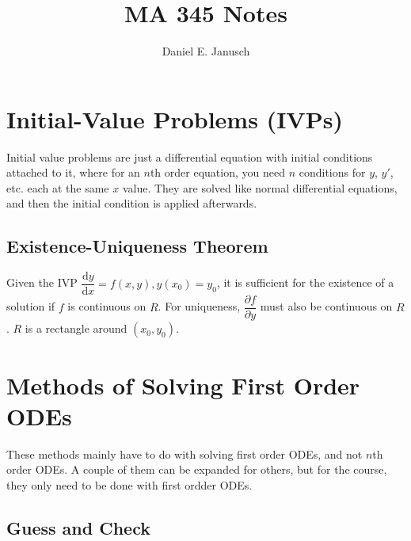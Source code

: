 \documentclass[12pt]{article}
\renewcommand \d [1] {\mathrm{d}{#1}}
\newcommand \ddf [2] {\dfrac{\d{#1}}{\d{#2}}}
\begin{document}


\title{MA 345 Notes}
\author{Daniel E. Janusch}
\maketitle

\tableofcontents

\newpage
\restoregeometry

\section{Initial-Value Problems (IVPs)}

Initial value problems are just a differential equation with initial conditions attached to it, where for an $n$th order equation, you need $n$ conditions for $y$, $y'$, etc. each at the same $x$ value. They are solved like normal differential equations, and then the initial condition is applied afterwards.

\subsection{Existence-Uniqueness Theorem}\label{ivp-exist-uniq-thm}

Given the IVP $\ddf yx = f(x, y), y(x_0) = y_0$, it is sufficient for the existence of a solution if $f$ is continuous on $R$. For uniqueness, $\dfrac {\partial f}{\partial y}$ must also be continuous on $R$. $R$ is a rectangle around $(x_0, y_0)$.

\section{Methods of Solving First Order ODEs}

These methods mainly have to do with solving first order ODEs, and not $n$th order ODEs.
A couple of them can be expanded for others, but for the course, they only need to be done with first ordder ODEs.

\subsection{Guess and Check}
\end{document}
